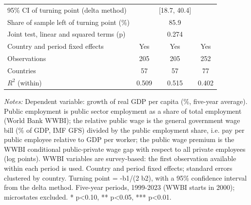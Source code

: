 \begin{table}[htbp]
\begin{tabular}{l*{3}{c}}
95\% CI of turning point (delta method) &  & [18.7, 40.4] &  \\
Share of sample left of turning point (\%) &  & 85.9 &  \\
Joint test, linear and squared terms (p) &  & 0.274 &  \\
Country and period fixed effects & Yes & Yes & Yes \\
Observations & 205 & 205 & 252 \\
Countries & 57 & 57 & 77 \\
$R^2$ (within) & 0.509 & 0.515 & 0.402 \\
\bottomrule
\end{tabular}
\begin{minipage}{0.95\linewidth}\vspace{4pt}\scriptsize \textit{Notes:} Dependent variable: growth of real GDP per capita (\%, five-year average). Public employment is public sector employment as a share of total employment (World Bank WWBI); the relative public wage is the general government wage bill (\% of GDP, IMF GFS) divided by the public employment share, i.e. pay per public employee relative to GDP per worker; the public wage premium is the WWBI conditional public-private wage gap with respect to all private employees (log points). WWBI variables are survey-based: the first observation available within each period is used. Country and period fixed effects; standard errors clustered by country. Turning point = -b1/(2 b2), with a 95\% confidence interval from the delta method. Five-year periods, 1999-2023 (WWBI starts in 2000); microstates excluded. * p<0.10, ** p<0.05, *** p<0.01.\end{minipage}
\end{table}
